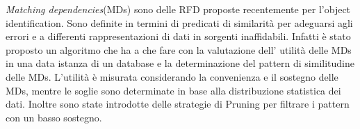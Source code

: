 \textit{Matching dependencies}(MDs) sono delle RFD proposte recentemente per l'object identification. Sono definite in termini di predicati di similarità per adeguarsi agli errori e a  differenti rappresentazioni di dati in sorgenti inaffidabili.
Infatti è stato proposto un algoritmo che ha a che fare con la valutazione dell' utilità delle MDs in una data istanza di un database e la determinazione del pattern di similitudine delle MDs.
L'utilità è misurata considerando la convenienza e il sostegno delle MDs, mentre le soglie sono determinate in base alla distribuzione statistica dei dati. Inoltre sono state introdotte delle strategie di Pruning per filtrare i pattern con un basso sostegno.